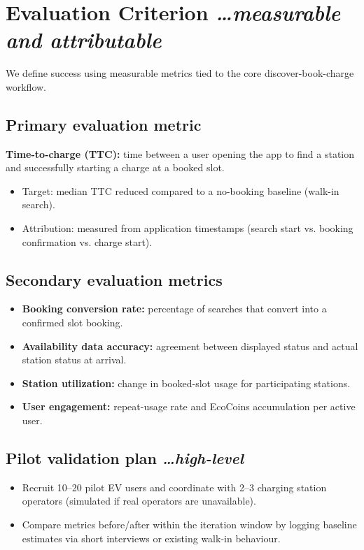 \documentclass[11pt,a4paper]{article}
\newcommand{\BvrHint}[1]{%
  {\normalfont\normalsize\itshape\hfill #1}}
\begin{document}
\section{Evaluation Criterion %
\BvrHint{\ldots measurable and attributable}}
We define success using measurable metrics tied to the core
discover-book-charge workflow.

\subsection{Primary evaluation metric}
\textbf{Time-to-charge (TTC):} time between a user opening
the app to find a station and successfully starting a
charge at a booked slot.
\begin{itemize}[leftmargin=0.7cm]
    \item Target: median TTC reduced compared to a no-booking baseline (walk-in search).
    \item Attribution: measured from application timestamps (search start vs. booking confirmation vs. charge start).
\end{itemize}

\subsection{Secondary evaluation metrics}
\begin{itemize}[leftmargin=0.7cm]
    \item \textbf{Booking conversion rate:} percentage of searches that convert into a confirmed slot booking.
    \item \textbf{Availability data accuracy:} agreement between displayed status and actual station status at arrival.
    \item \textbf{Station utilization:} change in booked-slot usage for participating stations.
    \item \textbf{User engagement:} repeat-usage rate and EcoCoins accumulation per active user.
\end{itemize}

\subsection{Pilot validation plan %
\BvrHint{\ldots high-level}}
\begin{itemize}[leftmargin=0.7cm]
    \item Recruit 10--20 pilot EV users and coordinate with 2--3 charging station operators (simulated if real operators are unavailable).
    \item Compare metrics before/after within the iteration window by logging baseline estimates via short interviews or existing walk-in behaviour.
\end{itemize}
\end{document}
